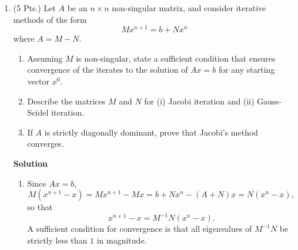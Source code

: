 \documentclass{article}
\begin{document}
\begin{enumerate}
\begin{enumerate}
\item Give a derivation of the formula that combines \(I_h\) and \(I_{h/2}\) to obtain an approximation to the integral that is fourth-order accurate.

\item When the trapezoidal method is applied to the function \(f(x) = x^{3/2}\), the rate of convergence is approximately \(1.7\).  What is the expected rate of convergence when the formula you derived in (a) is applied to \(f(x) = x^{3/2}\)?

\end{enumerate}

{\bf Solution}

\begin{enumerate}
\item For sufficiently smooth \(f\),
\[I_h = I + a h^3 + O(h^4),\]
for some \(a\) independent of \(h\), so
\[I_{h/2} = I + \frac{1}{8} a h^3 + O(h^4),\]
hence
\[\frac{8}{7} I_{h/2} - \frac{1}{7} I_h = I + O(h^4).\]

\item The supposition is that
\[I_h \approx I + a h^{1.7},\]
so the expression in (a) will not cancel this \(1.7\)-order term; i.e., the rate of convergence will remain approximately \(1.7\).

\end{enumerate}



\item (5 Pts.) Let \(A\) be an \(n \times n\) non-singular matrix, and consider iterative methods of the form
\[M x^{n + 1} = b + N x^n\]
where \(A = M - N\).

\begin{enumerate}
\item Assuming \(M\) is non-singular, state a sufficient condition that ensures convergence of the iterates to the solution of \(Ax = b\) for any starting vector \(x^0\).

\item Describe the matrices \(M\) and \(N\) for (i) Jacobi iteration and (ii) Gauss-Seidel iteration.

\item If \(A\) is strictly diagonally dominant, prove that Jacobi's method converges.

\end{enumerate}

{\bf Solution}

\begin{enumerate}
\item Since \(Ax = b\),
\[M(x^{n+1} - x) = Mx^{n+1} - Mx
                 = b + Nx^n - (A + N)x
                 = N(x^n - x),\]
so that
\[x^{n+1} - x = M^{-1}N(x^n - x).\]
A sufficient condition for convergence is that all eigenvalues of \(M^{-1}N\) be strictly less than \(1\) in magnitude.


\end{enumerate}
\end{enumerate}
\end{document}
